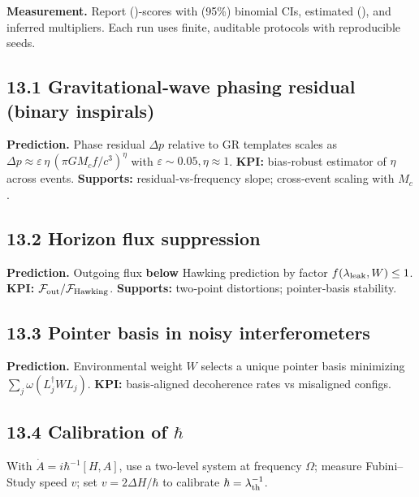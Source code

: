 \documentclass[
]{article}
\numberwithin{equation}{section}
\begin{document}
\textbf{Measurement.} Report ()-scores with (95\%) binomial
CIs, estimated (\chi), and inferred multipliers. Each run uses finite,
auditable protocols with reproducible seeds.

\hypertarget{gravitationalwave-phasing-residual-binary-inspirals}{%
\subsection{13.1 Gravitational‑wave phasing residual (binary
inspirals)}\label{gravitationalwave-phasing-residual-binary-inspirals}}

\textbf{Prediction.} Phase residual \(\Delta p\) relative to GR
templates scales as
\(\Delta p\approx \varepsilon\,\eta\,(\pi G M_c f/c^3)^{\!\eta}\) with
\(\varepsilon\sim0.05,\eta\approx1\). \textbf{KPI:} bias‑robust
estimator of \(\eta\) across events. \textbf{Supports:}
residual‑vs‑frequency slope; cross‑event scaling with \(M_c\).

\hypertarget{horizon-flux-suppression}{%
\subsection{13.2 Horizon flux
suppression}\label{horizon-flux-suppression}}

\textbf{Prediction.} Outgoing flux \textbf{below} Hawking prediction by
factor \(f(\lambda_{\rm leak},W)\le1\). \textbf{KPI:}
\(\mathcal F_{\rm out}/\mathcal F_{\rm Hawking}\). \textbf{Supports:}
two‑point distortions; pointer‑basis stability.

\hypertarget{pointer-basis-in-noisy-interferometers}{%
\subsection{13.3 Pointer basis in noisy
interferometers}\label{pointer-basis-in-noisy-interferometers}}

\textbf{Prediction.} Environmental weight \(W\) selects a unique pointer
basis minimizing \(\sum_j\omega(L_j^\dagger W L_j)\). \textbf{KPI:}
basis‑aligned decoherence rates vs misaligned configs.

\hypertarget{calibration-of-hbar}{%
\subsection{\texorpdfstring{13.4 Calibration of
\(\hbar\)}{13.4 Calibration of \textbackslash hbar}}\label{calibration-of-hbar}}

With \(\dot A=i\hbar^{-1}[H,A]\), use a two‑level system at frequency
\(\Omega\); measure Fubini--Study speed \(v\); set \(v=2\Delta H/\hbar\)
to calibrate \(\hbar=\lambda_{\rm th}^{-1}\).
\end{document}
